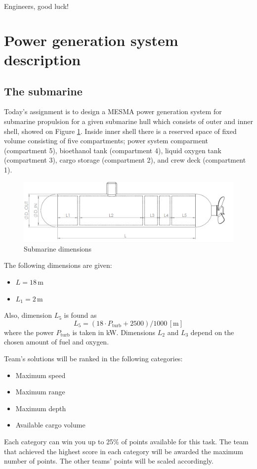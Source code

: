 \documentclass{article}
\begin{document}
	Engineers, good luck!
		
	\newpage
	\section{Power generation system description}
	
	
	\subsection{The submarine}
	
	Today's assignment is to design a MESMA power generation system for 
	submarine propulsion for a given submarine hull which consists of outer and 
	inner shell, showed on Figure \ref{fig:side_view}. Inside inner shell 
	there is a reserved space of fixed volume consisting of five compartments;
	power system comparment (compartment 5), bioethanol tank (compartment 4), 
	liquid oxygen tank (compartment 3), cargo storage (compartment 2), and crew 
	deck (compartment 1).
	
	
	\begin{figure}[h!]
		\centering
		\includegraphics[width=\textwidth]{submarine_side_view.png}
		\caption{Submarine dimensions}
		\label{fig:side_view}
	\end{figure}
	
	The following dimensions are given:
	\begin{itemize}
		\item $L = 18 \,\textrm{m}$
		\item $L_1 = 2 \,\textrm{m}$
	\end{itemize}
	Also, dimension $L_5$ is found as
	\begin{equation}
		L_5 = (18 \cdot P_\textrm{turb} + 2500)/1000 \,\left[\textrm{m}\right]
	\end{equation}
	where the power $P_\textrm{turb}$ is taken in kW. Dimensions $L_2$ and 
	$L_3$ depend on the chosen amount of fuel and oxygen.
	
	Team's solutions will be ranked in the following categories:
	\begin{itemize}
		\item Maximum speed
		\item Maximum range
		\item Maximum depth
		\item Available cargo volume
	\end{itemize}
    Each category can win you up to 25\% of points available for this task. The 
    team that achieved the highest score in each category will be awarded the 
    maximum number of points. The other teams' points will be scaled 
    accordingly.
\end{document}
